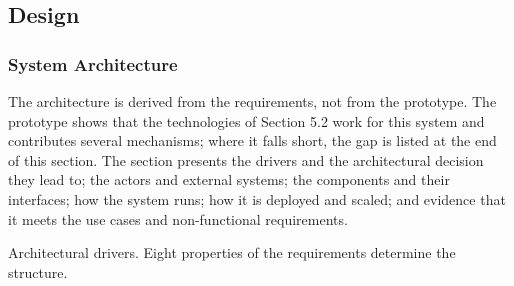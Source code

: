 \subsection{Design}

\subsubsection{System Architecture}

The architecture is derived from the requirements, not from the prototype. The prototype shows that the technologies of Section 5.2 work for this system and contributes several mechanisms; where it falls short, the gap is listed at the end of this section. The section presents the drivers and the architectural decision they lead to; the actors and external systems; the components and their interfaces; how the system runs; how it is deployed and scaled; and evidence that it meets the use cases and non-functional requirements.

Architectural drivers. Eight properties of the requirements determine the structure.

